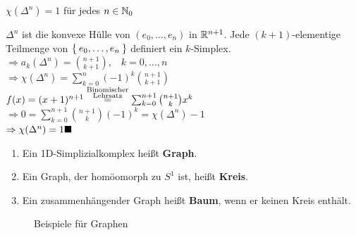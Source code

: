 \begin{korollar}
    $\chi(\Delta^n) = 1$ für jedes $n \in \mathbb{N}_0$
\end{korollar}

\begin{beweis}
    $\Delta^n$ ist die konvexe Hülle von $(e_0, \dots, e_n)$ in $\mathbb{R}^{n+1}$.
    Jede $(k+1)$-elementige Teilmenge von $\Set{e_0, \dots, e_n}$
    definiert ein $k$-Simplex.\\
    $\Rightarrow a_k(\Delta^n) = \binom{n+1}{k+1}, \;\;\; k = 0, \dots, n$\\
    $\Rightarrow \chi(\Delta^n) = \sum_{k=0}^n (-1)^k \binom{n+1}{k+1}$\\
    $f(x) = (x+1)^{n+1} \stackrel{\substack{\tiny\text{Binomischer}\\\text{Lehrsatz}}}{=} \sum_{k=0}^{n+1} \binom{n+1}{k} x^k$\\
    $\Rightarrow 0 = \sum_{k=0}^{n+1} \binom{n+1}{k} (-1)^k = \chi(\Delta^n) -1$\\
    $\Rightarrow \chi(\Delta^n) = 1 \qed$
\end{beweis}

\begin{definition}
    \begin{enumerate}[label=\alph*),ref=\theplaindefinition.\alph*]
        \item Ein 1D-Simplizialkomplex heißt \textbf{Graph}.
        \item Ein Graph, der homöomorph zu $S^1$ ist, heißt \textbf{Kreis}.
        \item Ein zusammenhängender Graph heißt \textbf{Baum},
              wenn er keinen Kreis enthält.
    \end{enumerate}
\end{definition}

\begin{figure}[ht]
    \centering

    \subfloat[$K_5$]{
        \parbox[c][3cm]{4cm}{\centering}
        \label{fig:k-5}
    }%
    \subfloat[$K_{3,3}$]{
        \parbox[c][3cm]{4cm}{\centering}
        \label{fig:k-3-3}
    }%
    \label{fig:graphen-beispiele}
    \caption{Beispiele für Graphen}
\end{figure}

